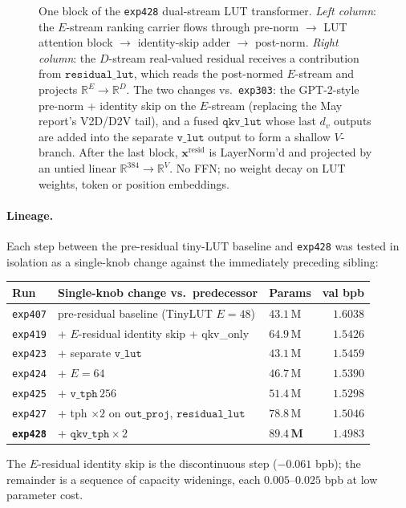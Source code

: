 \documentclass[11pt]{article}
\begin{document}
\begin{figure}[!ht]
\caption{One block of the \texttt{exp428} dual-stream LUT transformer. \emph{Left column}: the $E$-stream ranking carrier flows through pre-norm $\to$ LUT attention block $\to$ identity-skip adder $\to$ post-norm. \emph{Right column}: the $D$-stream real-valued residual receives a contribution from $\mathtt{residual\_lut}$, which reads the post-normed $E$-stream and projects $\mathbb{R}^E \to \mathbb{R}^D$. The two changes vs.\ \texttt{exp303}: the GPT-2-style pre-norm + identity skip on the $E$-stream (replacing the May report's V2D/D2V tail), and a fused $\mathtt{qkv\_lut}$ whose last $d_v$ outputs are added into the separate $\mathtt{v\_lut}$ output to form a shallow $V$-branch. After the last block, $\mathbf{x}^{\text{resid}}$ is LayerNorm'd and projected by an untied linear $\mathbb{R}^{384} \to \mathbb{R}^{V}$. No FFN; no weight decay on LUT weights, token or position embeddings.}
\label{fig:block}
\end{figure}

\paragraph{Lineage.}
Each step between the pre-residual tiny-LUT baseline and \texttt{exp428} was tested in isolation as a single-knob change against the immediately preceding sibling:

\begin{center}\small
\begin{tabular}{lllr}
\toprule
Run & Single-knob change vs.\ predecessor & Params & val bpb \\
\midrule
\texttt{exp407} & pre-residual baseline (TinyLUT $E{=}48$)           & $43.1$\,M & $1.6038$ \\
\texttt{exp419} & + $E$-residual identity skip + qkv\_only           & $64.9$\,M & $1.5426$ \\
\texttt{exp423} & + separate $\mathtt{v\_lut}$                      & $43.1$\,M & $1.5459$ \\
\texttt{exp424} & + $E{=}64$                                          & $46.7$\,M & $1.5390$ \\
\texttt{exp425} & + $\mathtt{v\_tph}\,256$                            & $51.4$\,M & $1.5298$ \\
\texttt{exp427} & + tph $\times 2$ on $\mathtt{out\_proj}$, $\mathtt{residual\_lut}$ & $78.8$\,M & $1.5046$ \\
\textbf{\texttt{exp428}} & + $\mathtt{qkv\_tph} \times 2$            & $\mathbf{89.4}$\,\textbf{M} & $\mathbf{1.4983}$ \\
\bottomrule
\end{tabular}
\end{center}
The $E$-residual identity skip is the discontinuous step ($-0.061$ bpb); the remainder is a sequence of capacity widenings, each $0.005$--$0.025$ bpb at low parameter cost.
\end{document}
